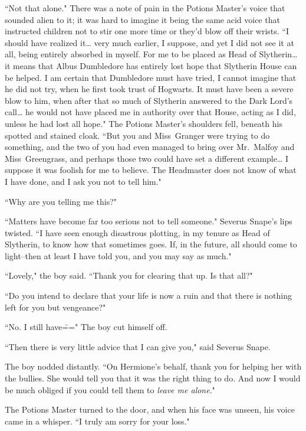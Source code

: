 ``Not that alone." There was a note of pain in the Potions Master's voice that sounded alien to it; it was hard to imagine it being the same acid voice that instructed children not to stir one more time or they'd blow off their wrists. ``I should have realized it{\ldots} very much earlier, I suppose, and yet I did not see it at all, being entirely absorbed in myself. For me to be placed as Head of Slytherin{\ldots} it means that Albus Dumbledore has entirely lost hope that Slytherin House can be helped. I am certain that Dumbledore must have tried, I cannot imagine that he did not try, when he first took trust of Hogwarts. It must have been a severe blow to him, when after that so much of Slytherin answered to the Dark Lord's call{\ldots} he would not have placed me in authority over that House, acting as I did, unless he had lost all hope." The Potions Master's shoulders fell, beneath his spotted and stained cloak. ``But you and Miss~Granger were trying to do something, and the two of you had even managed to bring over Mr.~Malfoy and Miss~Greengrass, and perhaps those two could have set a different example{\ldots} I suppose it was foolish for me to believe. The Headmaster does not know of what I have done, and I ask you not to tell him."

``Why are you telling me this?"

``Matters have become far too serious not to tell someone." Severus Snape's lips twisted. ``I have seen enough disastrous plotting, in my tenure as Head of Slytherin, to know how that sometimes goes. If, in the future, all should come to light\---then at least I have told you, and you may say as much."

``Lovely," the boy said. ``Thank you for clearing that up. Is that all?"

``Do you intend to declare that your life is now a ruin and that there is nothing left for you but vengeance?"

``No. I still have\===" The boy cut himself off.

``Then there is very little advice that I can give you," said Severus Snape.

The boy nodded distantly. ``On Hermione's behalf, thank you for helping her with the bullies. She would tell you that it was the right thing to do. And now I would be much obliged if you could tell them to \emph{leave me alone}."

The Potions Master turned to the door, and when his face was unseen, his voice came in a whisper. ``I truly am sorry for your loss."

